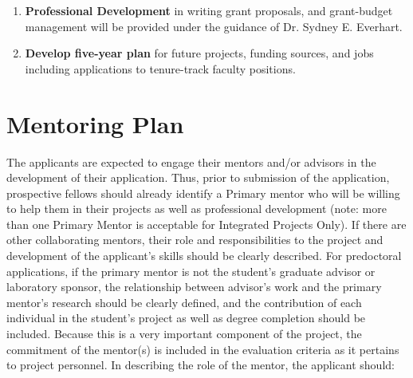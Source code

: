 \documentclass[12pt,letterpaper]{article}
\begin{document}
\begin{enumerate}
  \item \textbf{Professional Development} in writing grant proposals, and grant-budget management will be provided under the guidance of Dr. Sydney E. Everhart.
  \item \textbf{Develop five-year plan} for future projects, funding sources, and jobs including applications to tenure-track faculty positions.  
\end{enumerate}



\section{Mentoring Plan}

The applicants are expected to engage their mentors and/or advisors in the
development of their application. Thus, prior to submission of the
application, prospective fellows should already identify a Primary mentor who
will be willing to help them in their projects as well as professional
development (note: more than one Primary Mentor is acceptable for Integrated
Projects Only). If there are other collaborating mentors, their role and
responsibilities to the project and development of the applicant's skills
should be clearly described. For predoctoral applications, if the primary
mentor is not the student's graduate advisor or laboratory sponsor, the
relationship between advisor's work and the primary mentor's research should
be clearly defined, and the contribution of each individual in the student's
project as well as degree completion should be included. Because this is a
very important component of the project, the commitment of the mentor(s) is
included in the evaluation criteria as it pertains to project personnel. In
describing the role of the mentor, the applicant should:
\end{document}

